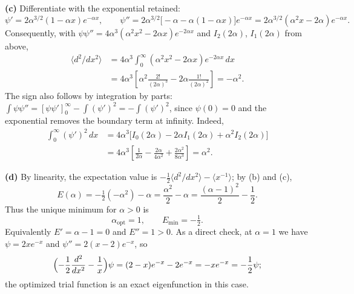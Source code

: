 \textbf{(c)} Differentiate with the exponential retained:
\[
\psi'=2\alpha^{3/2}(1-\alpha x)e^{-\alpha x},\qquad
\psi''=2\alpha^{3/2}\bigl[-\alpha-\alpha(1-\alpha x)\bigr]e^{-\alpha x}
=2\alpha^{3/2}(\alpha^2x-2\alpha)e^{-\alpha x}.
\]
Consequently, with $\psi\psi''=4\alpha^3(\alpha^2x^2-2\alpha x)e^{-2\alpha x}$
and $I_2(2\alpha)$, $I_1(2\alpha)$ from above,
\begin{align*}
\langle d^2/dx^2\rangle
&=4\alpha^3\int_0^\infty
 (\alpha^2x^2-2\alpha x)e^{-2\alpha x}\,dx\\
&=4\alpha^3\left[\alpha^2\frac{2!}{(2\alpha)^3}
 -2\alpha\frac{1!}{(2\alpha)^2}\right]
=\boxed{-\alpha^2}.
\end{align*}
The sign also follows by integration by parts:
$\int\psi\psi''=[\psi\psi']_0^\infty-\int(\psi')^2
=-\int(\psi')^2$, since $\psi(0)=0$ and the exponential removes
the boundary term at infinity.  Indeed,
\begin{align*}
\int_0^\infty(\psi')^2\,dx
&=4\alpha^3\bigl[I_0(2\alpha)-2\alpha I_1(2\alpha)
+\alpha^2I_2(2\alpha)\bigr]\\
&=4\alpha^3\left[\frac1{2\alpha}-\frac{2\alpha}{4\alpha^2}
+\frac{2\alpha^2}{8\alpha^3}\right]=\alpha^2.
\end{align*}

\textbf{(d)} By linearity, the expectation value is
$-\frac12\langle d^2/dx^2\rangle-\langle x^{-1}\rangle$; by (b) and
(c),
\[
E(\alpha)=-\tfrac12(-\alpha^2)-\alpha
=\frac{\alpha^2}{2}-\alpha
=\frac{(\alpha-1)^2}{2}-\frac12.
\]
Thus the unique minimum for $\alpha>0$ is
\[
\boxed{\alpha_{\mathrm{opt}}=1,\qquad E_{\min}=-\tfrac12}.
\]
Equivalently $E'=\alpha-1=0$ and $E''=1>0$.
As a direct check, at $\alpha=1$ we have $\psi=2xe^{-x}$ and
$\psi''=2(x-2)e^{-x}$, so
\[
\Bigl(-\frac12\frac{d^2}{dx^2}-\frac1x\Bigr)\psi
=(2-x)e^{-x}-2e^{-x}=-xe^{-x}=-\frac12\psi;
\]
the optimized trial function is an exact eigenfunction in this case.
